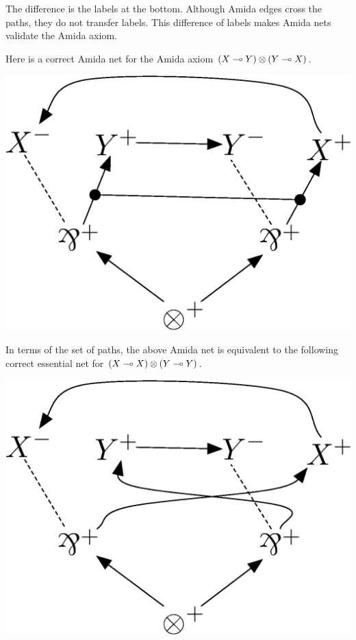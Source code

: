 The difference is the labels at the bottom.
Although Amida edges cross the paths,
they do not transfer labels.
This difference of labels makes Amida nets validate the Amida axiom.
 \begin{example}
  Here is a correct Amida net for the Amida axiom $(X\multimap Y)\otimes(Y\multimap X)$.
   \begin{center}
    \includegraphics[scale=0.4]{amida-axiom.eps}
   \end{center}
  In terms of the set of paths, the above Amida net is equivalent to the
  following correct essential net for $(X\multimap X)\otimes (Y\multimap Y)$.
   \begin{center}
    \includegraphics[scale=0.4]{amida-axiom-cross.eps}
   \end{center}
 \end{example}

